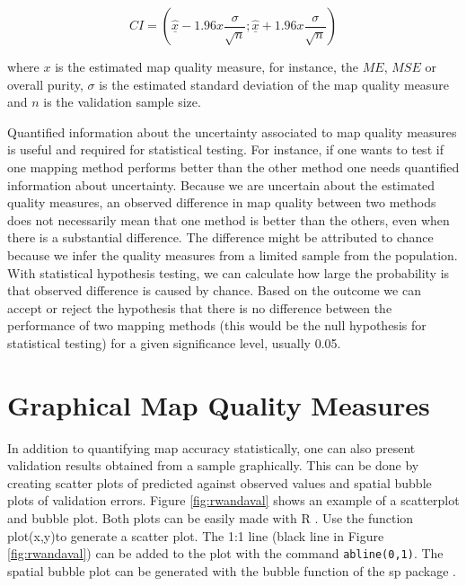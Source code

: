 \documentclass[10pt,b5paper,]{book}
\theoremstyle{definition}
\theoremstyle{definition}
\theoremstyle{definition}
\theoremstyle{remark}
\begin{document}
\begin{equation}
CI = (\underline{\hat{x}} - 1.96x \frac{\sigma}{\sqrt{n} } ; \underline{\hat{x}} + 1.96x \frac{\sigma}{\sqrt{n} })
\end{equation}

where \(x\) is the estimated map quality measure, for instance, the
\(ME\), \(MSE\) or overall purity, \(\sigma\) is the estimated standard
deviation of the map quality measure and \(n\) is the validation sample
size.

Quantified information about the uncertainty associated to map quality
measures is useful and required for statistical testing. For instance,
if one wants to test if one mapping method performs better than the
other method one needs quantified information about uncertainty. Because
we are uncertain about the estimated quality measures, an observed
difference in map quality between two methods does not necessarily mean
that one method is better than the others, even when there is a
substantial difference. The difference might be attributed to chance
because we infer the quality measures from a limited sample from the
population. With statistical hypothesis testing, we can calculate how
large the probability is that observed difference is caused by chance.
Based on the outcome we can accept or reject the hypothesis that there
is no difference between the performance of two mapping methods (this
would be the null hypothesis for statistical testing) for a given
significance level, usually 0.05.

\hypertarget{graphical-map-quality-measures}{%
\section{Graphical Map Quality
Measures}\label{graphical-map-quality-measures}}

In addition to quantifying map accuracy statistically, one can also
present validation results obtained from a sample graphically. This can
be done by creating scatter plots of predicted against observed values
and spatial bubble plots of validation errors. Figure
\ref{fig:rwandaval} shows an example of a scatterplot and bubble plot.
Both plots can be easily made with R \citep{rcore}. Use the function
plot(x,y)to generate a scatter plot. The 1:1 line (black line in Figure
\ref{fig:rwandaval}) can be added to the plot with the command
\texttt{abline(0,1)}. The spatial bubble plot can be generated with the
bubble function of the sp package \citep{pebesma2005classes}.
\end{document}
